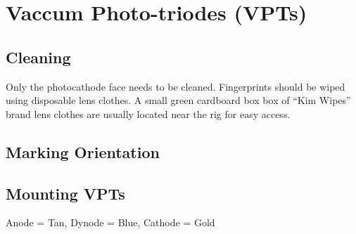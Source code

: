 
\section{Vaccum Photo-triodes (VPTs)}
\label{sec:op_vpt}

\subsection{Cleaning}
\label{sec:op_vpt:cleaning}

Only the photocathode face needs to be cleaned.  Fingerprints should be wiped using disposable lens clothes.  A small green cardboard box box of ``Kim Wipes'' brand lens clothes are usually located near the rig for easy access.

\subsection{Marking Orientation}
\label{sec:op_vpt:orienting}

\subsection{Mounting VPTs}
\label{sec:op_vpt:mounting}

Anode = Tan, Dynode = Blue, Cathode = Gold



